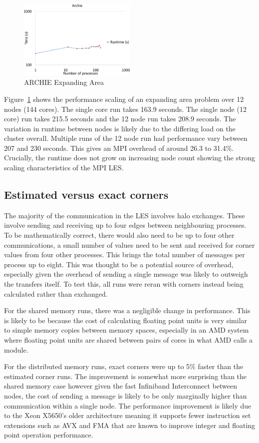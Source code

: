 \begin{figure}
    \includegraphics[page=1,width=0.5\textwidth]
    {graphs/ARCHIE-OpenMPI162-GFORTRAN482-default-mapping-expanding-area-crop.pdf}
    \caption{ARCHIE Expanding Area}
    \label{fig:archieexpandingarea}
\end{figure}

Figure~\ref{fig:archieexpandingarea} shows the performance scaling of an
expanding area problem over 12 nodes (144 cores). The single core run takes
163.9 seconds. The single node (12 core) run takes 215.5 seconds and the 12 node
run takes 208.9 seconds. The variation in runtime between nodes is likely due to
the differing load on the cluster overall. Multiple runs of the 12 node run had
performance vary between 207 and 230 seconds. This gives an MPI overhead of
around 26.3 to 31.4\%. Crucially, the runtime does not grow on increasing node
count showing the strong scaling characteristics of the MPI LES.

\subsection{Estimated versus exact corners}

The majority of the communication in the LES involves halo exchanges. These
involve sending and receiving up to four edges between neighbouring processes.
To be mathematically correct, there would also need to be up to four other
communications, a small number of values need to be sent and received for corner
values from four other processes. This brings the total number of messages per
process up to eight. This was thought to be a potential source of overhead,
especially given the overhead of sending a single message was likely to outweigh
the transfers itself. To test this, all runs were reran with corners instead
being calculated rather than exchanged.

For the shared memory runs, there was a negligible change in performance. This
is likely to be because the cost of calculating floating point units is very
similar to simple memory copies between memory spaces, especially in an AMD
system where floating point units are shared between pairs of cores in what AMD
calls a module.

For the distributed memory runs, exact corners were up to 5\% faster than the
estimated corner runs. The improvement is somewhat more surprising than the
shared memory case however given the fast Infiniband Interconnect between nodes,
the cost of sending a message is likely to be only marginally higher than
communication within a single node. The performance improvement is likely due to
the Xeon X5650's older architecture meaning it supports fewer instruction set
extensions such as AVX and FMA that are known to improve integer and floating
point operation performance.
